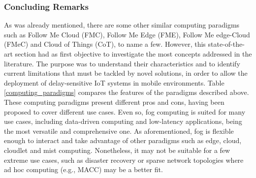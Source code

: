 \subsubsection{Concluding Remarks}
\noindent As was already mentioned, there are some other similar computing paradigms such as Follow Me Cloud (FMC), Follow Me Edge (FME), Follow Me edge-Cloud (FMeC) and Cloud of Things (CoT), to name a few. However, this state-of-the-art section had as first objective to investigate the most concepts addressed in the literature. The purpose was to understand their characteristics and to identify current limitations that must be tackled by novel solutions, in order to allow the deployment of delay-sensitive IoT systems in mobile environments. Table \ref{computing_paradigms} compares the features of the paradigms described above.\\
\noindent\tab These computing paradigms present different pros and cons, having been proposed to cover different use cases. Even so, fog computing is suited for many use cases, including data-driven computing and low-latency applications, being the most versatile and comprehensive one. As aforementioned, fog is flexible enough to interact and take advantage of other paradigms such as edge, cloud, cloudlet and mist computing. Nonetheless, it may not be suitable for a few extreme use cases, such as disaster recovery or sparse network topologies where ad hoc computing (e.g., MACC) may be a better fit.
